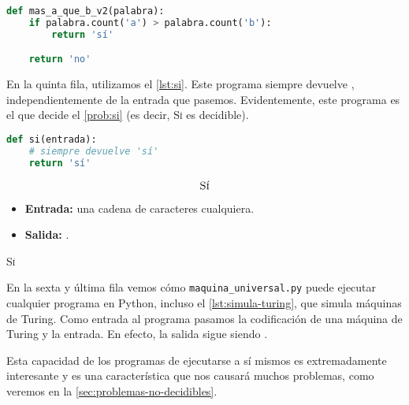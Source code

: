 \vspace{8pt}
\begin{lstlisting}[language=Python, caption=\lstinline{mas_a_que_b_v2.py},label={lst:mas-a-que-b-v2}]
def mas_a_que_b_v2(palabra):
    if palabra.count('a') > palabra.count('b'):
        return 'sí'

    return 'no'
\end{lstlisting}

En la quinta fila, utilizamos el \cref{lst:si}. Este programa siempre devuelve , independientemente de la entrada que pasemos. Evidentemente, este programa es el que decide el \cref{prob:si} (es decir, \textsc{Sí} es decidible).\label{lab:si-decidible}
\vspace{8pt}
\begin{lstlisting}[language=Python, caption=\lstinline{si.py},label={lst:si}]
def si(entrada):
    # siempre devuelve 'sí'
    return 'sí'
\end{lstlisting}
\begin{problema}
\begin{framed}
$$\text{\textsc{Sí}}$$

\begin{itemize}
    \item \textbf{Entrada:} una cadena de caracteres cualquiera.
    \item \textbf{Salida:} .
\end{itemize}
\end{framed}
\caption{\textsc{Sí}}
\label{prob:si}
\end{problema}
En la sexta y última fila vemos cómo \texttt{maquina\_universal.py} puede ejecutar cualquier programa en Python, incluso el \cref{lst:simula-turing}, que simula máquinas de Turing. Como entrada al programa pasamos la codificación de una máquina de Turing y la entrada. En efecto, la salida sigue siendo .

Esta capacidad de los programas de ejecutarse a sí mismos es extremadamente interesante y es una característica que nos causará muchos problemas, como veremos en la \cref{sec:problemas-no-decidibles}.
\vspace{8pt}

%

